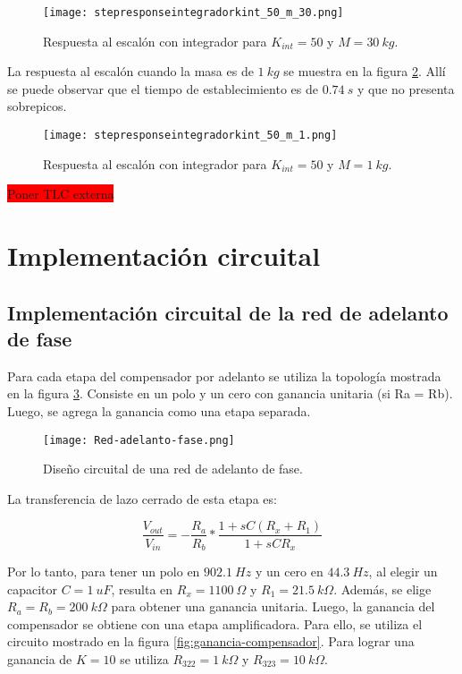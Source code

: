 \begin{figure}[H]
	\centering
	\texttt{[image: stepresponseintegradorkint\_50\_m\_30.png]}
	\caption{Respuesta al escalón con integrador para $K_{int}=50$ y $M = 30\:kg$.}
	\label{fig:respuesta-al-escalon-con-k-50-M-30}
\end{figure}

\noindent La respuesta al escal\'{o}n cuando la masa es de $1 \:kg$ se muestra en la figura \ref{fig:respuesta-al-escalon-con-k-50-M-1}. All\'{i} se puede observar que el tiempo de establecimiento es de $0.74\:s$ y que no presenta sobrepicos.

\begin{figure}[H]
	\centering
	\texttt{[image: stepresponseintegradorkint\_50\_m\_1.png]}
	\caption{Respuesta al escalón con integrador para $K_{int} =50$ y $M = 1 \:kg$.}
	\label{fig:respuesta-al-escalon-con-k-50-M-1}
\end{figure}

\colorbox{red}{Poner TLC externa}

\section{Implementación circuital}

\subsection{Implementación circuital de la red de adelanto de fase}

\noindent Para cada etapa del compensador por adelanto se utiliza la topología mostrada en la figura \ref{fig:red-adelanto-fase}. Consiste en  un polo y un cero con ganancia unitaria (si Ra = Rb). Luego, se agrega la ganancia como una etapa separada.

\begin{figure}[H]
	\centering
	\texttt{[image: Red-adelanto-fase.png]}
	\caption{Diseño circuital de una red de adelanto de fase.}
	\label{fig:red-adelanto-fase}
\end{figure}

\noindent La transferencia de lazo cerrado de esta etapa es:

\begin{equation} 
	\frac{V_{out}}{V_{in}}= - \frac{R_a}{R_b}*\frac{1+sC(R_x+R_1)}{1+sCR_x}
\end{equation}

\noindent Por lo tanto, para tener un polo en $902.1\:Hz$ y un cero en $44.3\:Hz$, al elegir un capacitor $C = 1\:uF$, resulta en $R_x = 1100\:\Omega$ y $R_1 = 21.5\:k\Omega$. Además, se elige $R_a = R_b = 200\:k\Omega$ para obtener una ganancia unitaria. Luego, la ganancia del compensador se obtiene con una etapa amplificadora.
Para ello, se utiliza el circuito mostrado en la figura \ref{fig:ganancia-compensador}. Para lograr una ganancia de $K=10$ se utiliza $R_{322} = 1\:k\Omega$ y $R_{323} = 10\:k\Omega$.


